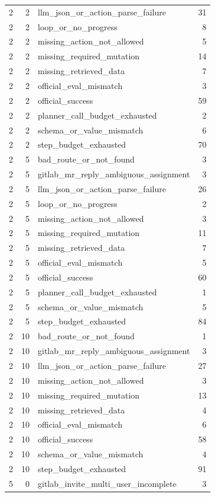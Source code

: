 \begin{tabular}{rrlr}
2 & 2 & llm_json_or_action_parse_failure & 31 \\
2 & 2 & loop_or_no_progress & 8 \\
2 & 2 & missing_action_not_allowed & 5 \\
2 & 2 & missing_required_mutation & 14 \\
2 & 2 & missing_retrieved_data & 7 \\
2 & 2 & official_eval_mismatch & 3 \\
2 & 2 & official_success & 59 \\
2 & 2 & planner_call_budget_exhausted & 2 \\
2 & 2 & schema_or_value_mismatch & 6 \\
2 & 2 & step_budget_exhausted & 70 \\
2 & 5 & bad_route_or_not_found & 3 \\
2 & 5 & gitlab_mr_reply_ambiguous_assignment & 3 \\
2 & 5 & llm_json_or_action_parse_failure & 26 \\
2 & 5 & loop_or_no_progress & 2 \\
2 & 5 & missing_action_not_allowed & 3 \\
2 & 5 & missing_required_mutation & 11 \\
2 & 5 & missing_retrieved_data & 7 \\
2 & 5 & official_eval_mismatch & 5 \\
2 & 5 & official_success & 60 \\
2 & 5 & planner_call_budget_exhausted & 1 \\
2 & 5 & schema_or_value_mismatch & 5 \\
2 & 5 & step_budget_exhausted & 84 \\
2 & 10 & bad_route_or_not_found & 1 \\
2 & 10 & gitlab_mr_reply_ambiguous_assignment & 3 \\
2 & 10 & llm_json_or_action_parse_failure & 27 \\
2 & 10 & missing_action_not_allowed & 3 \\
2 & 10 & missing_required_mutation & 13 \\
2 & 10 & missing_retrieved_data & 4 \\
2 & 10 & official_eval_mismatch & 6 \\
2 & 10 & official_success & 58 \\
2 & 10 & schema_or_value_mismatch & 4 \\
2 & 10 & step_budget_exhausted & 91 \\
5 & 0 & gitlab_invite_multi_user_incomplete & 3 \\

\end{tabular}
